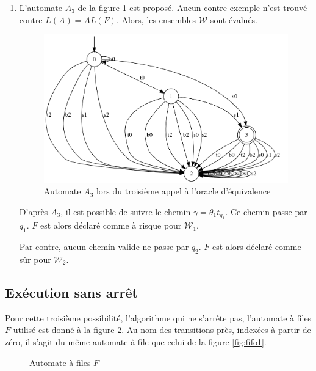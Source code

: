 \begin{enumerate}
\item L'automate $A_3$ de la figure \ref{fig:fina3} est proposé. Aucun contre-exemple n'est trouvé contre $L(A)=AL(F)$. Alors, les ensembles $\mathcal{W}$ sont évalués.
\begin{figure}[H]
  \centering
  \includegraphics[width=0.6\linewidth]{res/minimalist_2}
  \caption{Automate $A_3$ lors du troisième appel à l'oracle d'équivalence}\label{fig:fina3}
\end{figure}

D'après $A_3$, il est possible de suivre le chemin $\gamma=\theta_1t_{q_1}$. Ce chemin passe par $q_1$. $F$ est alors déclaré comme à risque pour $\mathcal{W}_1$.

Par contre, aucun chemin valide ne passe par $q_2$. $F$ est alors déclaré comme sûr pour $\mathcal{W}_2$.
\end{enumerate}



\subsection{Exécution sans arrêt}

Pour cette troisième possibilité, l'algorithme qui ne s'arrête pas, l'automate à files $F$ utilisé est donné à la figure \ref{fig:fifo2}. Au nom des transitions près, indexées à partir de zéro, il s'agit du même automate à file que celui de la figure \ref{fig:fifo1}.

\begin{figure}[H]
  \centering
  \caption{Automate à files $F$}\label{fig:fifo2}
\end{figure}

